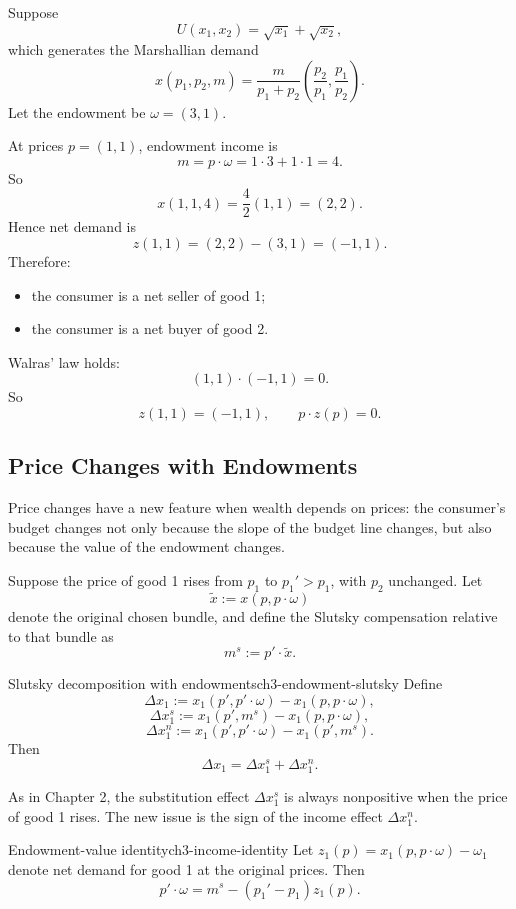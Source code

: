\begin{examplebox}[title={Worked Example: net demand and Walras' law}]
Suppose
\[
U(x_1,x_2)=\sqrt{x_1}+\sqrt{x_2},
\]
which generates the Marshallian demand
\[
x(p_1,p_2,m)
=
\frac{m}{p_1+p_2}
\left(
\frac{p_2}{p_1},
\frac{p_1}{p_2}
\right).
\]
Let the endowment be $\omega=(3,1)$.

At prices $p=(1,1)$, endowment income is
\[
m=p\cdot \omega = 1\cdot 3 + 1\cdot 1 = 4.
\]
So
\[
x(1,1,4)=\frac{4}{2}(1,1)=(2,2).
\]
Hence net demand is
\[
z(1,1)=(2,2)-(3,1)=(-1,1).
\]
Therefore:
\begin{itemize}
    \item the consumer is a net seller of good 1;
    \item the consumer is a net buyer of good 2.
\end{itemize}

Walras' law holds:
\[
(1,1)\cdot(-1,1)=0.
\]
So
\[
\boxed{z(1,1)=(-1,1),\qquad p\cdot z(p)=0.}
\]
\end{examplebox}

\subsection{Price Changes with Endowments}

Price changes have a new feature when wealth depends on prices: the consumer's budget changes not only because the slope of the budget line changes, but also because the value of the endowment changes.

Suppose the price of good 1 rises from $p_1$ to $p_1' > p_1$, with $p_2$ unchanged. Let
\[
\tilde x := x(p,p\cdot \omega)
\]
denote the original chosen bundle, and define the Slutsky compensation relative to that bundle as
\[
m^s := p'\cdot \tilde x.
\]

\begin{definition}{Slutsky decomposition with endowments}{ch3-endowment-slutsky}
Define
\[
\Delta x_1 := x_1(p',p'\cdot \omega)-x_1(p,p\cdot \omega),
\]
\[
\Delta x_1^s := x_1(p',m^s)-x_1(p,p\cdot \omega),
\]
\[
\Delta x_1^n := x_1(p',p'\cdot \omega)-x_1(p',m^s).
\]
Then
\[
\Delta x_1 = \Delta x_1^s + \Delta x_1^n.
\]
\end{definition}

As in Chapter 2, the substitution effect $\Delta x_1^s$ is always nonpositive when the price of good 1 rises. The new issue is the sign of the income effect $\Delta x_1^n$.

\begin{theorem}{Endowment-value identity}{ch3-income-identity}
Let $z_1(p)=x_1(p,p\cdot \omega)-\omega_1$ denote net demand for good 1 at the original prices. Then
\[
p'\cdot \omega = m^s - (p_1'-p_1)z_1(p).
\]
\end{theorem}

